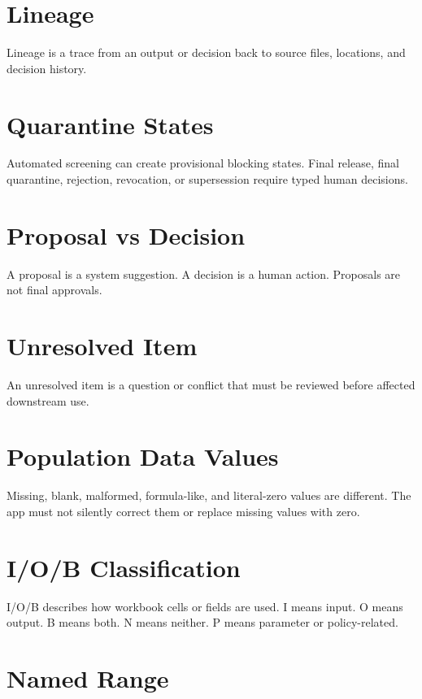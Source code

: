 \section{Lineage}

Lineage is a trace from an output or decision back to source files, locations, and decision history.

\section{Quarantine States}

Automated screening can create provisional blocking states. Final release, final quarantine, rejection, revocation, or supersession require typed human decisions.

\section{Proposal vs Decision}

A proposal is a system suggestion. A decision is a human action. Proposals are not final approvals.

\section{Unresolved Item}

An unresolved item is a question or conflict that must be reviewed before affected downstream use.

\section{Population Data Values}

Missing, blank, malformed, formula-like, and literal-zero values are different. The app must not silently correct them or replace missing values with zero.

\section{I/O/B Classification}

I/O/B describes how workbook cells or fields are used. I means input. O means output. B means both. N means neither. P means parameter or policy-related.

\section{Named Range}

